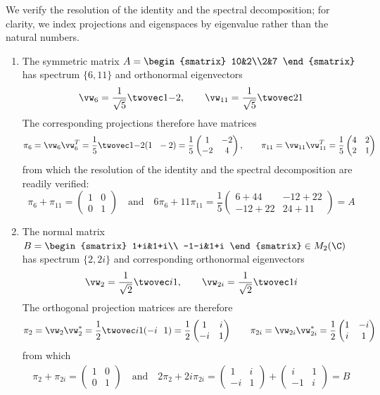 \begin{examples}{}{}
We verify the resolution of the identity and the spectral decomposition; for clarity, we index projections and eigenspaces by eigenvalue rather than the natural numbers.
\begin{enumerate}
  \item The symmetric matrix $A=\begin{smatrix}
  10&2\\2&7
  \end{smatrix}$ has spectrum $\{6,11\}$ and orthonormal eigenvectors
  \[\vw_6=\frac 1{\sqrt 5}\twovec 1{-2},\qquad \vw_{11}=\frac 1{\sqrt 5}\twovec 21\]
  The corresponding projections therefore have matrices
  \[\pi_6=\vw_6\vw_6^T=\frac 15\twovec 1{-2}(1\ \ -2)
  =\frac 15\begin{pmatrix}
  1&-2\\-2&4
  \end{pmatrix},\qquad
  \pi_{11}=\vw_{11}\vw_{11}^T
  =\frac 15\begin{pmatrix}
  4&2\\2&1
  \end{pmatrix}\]
  from which the resolution of the identity and the spectral decomposition are readily verified:
  \[\pi_6+\pi_{11}=\begin{pmatrix}
1&0\\0&1
  \end{pmatrix}
  \quad\text{and}\quad
  6\pi_6+11\pi_{11}= \frac 15\begin{pmatrix}
  6+44&-12+22\\
  -12+22&24+11
  \end{pmatrix}=A\]
  
  \item The normal matrix $B=\begin{smatrix}
		1+i&1+i\\
		-1-i&1+i
  \end{smatrix}\in M_2(\C)$ has spectrum $\{2,2i\}$ and corresponding
orthonormal eigenvectors
	\[\vw_2=\frac 1{\sqrt 2}\twovec i1,\qquad \vw_{2i}=\frac 1{\sqrt 2}\twovec 1i\]
	The orthogonal projection matrices are therefore
	\[\pi_2=\vw_2\vw_2^*=\frac 12\twovec i1(-i\ \ 1)=\frac 12\begin{pmatrix}
1&i\\-i&1
	\end{pmatrix}
	\qquad \pi_{2i}=\vw_{2i}\vw_{2i}^*=\frac 12\begin{pmatrix}
	1&-i\\i&1
	\end{pmatrix}\]
	from which
	\begin{gather*}
		\pi_2+\pi_{2i}=\begin{pmatrix}
		1&0\\0&1
		\end{pmatrix}\quad\text{and}\quad
		2\pi_2+2i\pi_{2i}=\begin{pmatrix}
		1&i\\-i&1
		\end{pmatrix}+\begin{pmatrix}
		i&1\\-1&i
		\end{pmatrix}=B
	\end{gather*}


\end{enumerate}
\end{examples}
